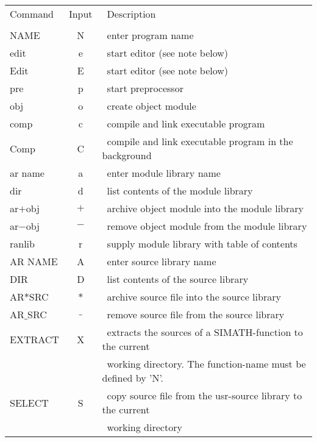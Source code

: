 \newpage
\begin{tabular}{lcl}\index{commands}
Command         & Input          & \ Description \\
\cline{1-3}\\
NAME            & N              & \ enter program name \\
edit            & e              & \ start editor (see note below) \\
Edit            & E              & \ start editor (see note below) \\
pre             & p              & \ start preprocessor \\
obj             & o              & \ create object module \\
comp            & c              & \ compile and link executable program \\
Comp            & C              & \ compile and link executable program in the background \\
ar name         & a              & \ enter module library name \\
dir             & d              & \ list contents of the module library \\
ar$+$obj        & $+$            & \ archive object module into the module library\\
ar$-$obj        & $-$            & \ remove object module from the module library \\
ranlib          & r              & \ supply module library with table of contents \\
AR NAME         & A              & \ enter source library name \\
DIR             & D              & \ list contents of the source library \\
AR$*$SRC        & $*$            & \ archive source file into the source library\\
AR$\_$SRC       & $\_$           & \ remove source file from the source library \\
EXTRACT         & X              & \ extracts the sources of a SIMATH-function
to the current \\  
                &                & \ working directory. The function-name must be defined by
'N'. \\
SELECT          & S              & \ copy source file from the usr-source library to the
                                    current \\
                &               & \ working directory \\

\end{tabular}
